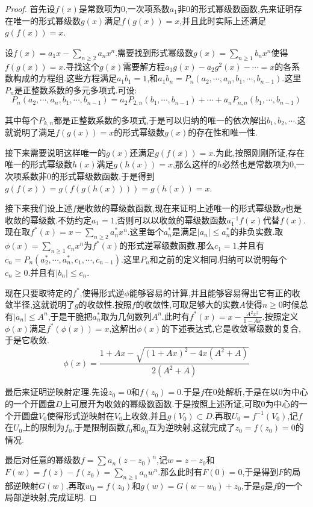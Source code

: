 \begin{proof}

首先设$f(x)$是常数项为0,一次项系数$a_1$非0的形式幂级数函数,先来证明存在唯一的形式幂级数$g(x)$满足$f(g(x))=x$,并且此时实际上还满足$g(f(x))=x$.

设$f(x)=a_1x-\sum_{n\ge2}a_nx^n$.需要找到形式幂级数$g(x)=\sum_{n\ge1}b_nx^n$使得$f(g(x))=x$.寻找这个$g(x)$需要解方程$a_1g(x)-a_2g^2(x)-\cdots=x$的各系数构成的方程组.这些方程满足$a_1b_1=1$,和$a_1b_n=P_n(a_2,\cdots,a_n,b_1,\cdots,b_{n-1})$.这里$P_n$是正整数系数的多元多项式.可设:
$$P_n(a_2,\cdots,a_n,b_1,\cdots,b_{n-1})=a_2P_{2,n}(b_1,\cdots,b_{n-1})+\cdots+a_nP_{n,n}(b_1,\cdots,b_{n-1})$$

其中每个$P_{k,n}$都是正整数系数的多项式,于是可以归纳的唯一的依次解出$b_1,b_2,\cdots$.这就说明了满足$f(g(x))=x$的形式幂级数$g(x)$的存在性和唯一性.

接下来需要说明这样唯一的$g(x)$还满足$g(f(x))=x$.为此,按照刚刚所证,存在唯一的形式幂级数$h(x)$满足$g(h(x))=x$,那么这样的$h$必然也是常数项为0,一次项系数非0的形式幂级数函数.于是得到$g(f(x))=g(f(g(h(x))))=g(h(x))=x$.

接下来我们设上述$f$是收敛的幂级数函数,现在来证明上述唯一的形式幂级数$g$也是收敛的幂级数.不妨约定$a_1=1$,否则可以以收敛的幂级数函数$a_1^{-1}f(x)$代替$f(x)$.现在取$f^*(x)=x-\sum_{n\ge2}a_n^*x^n$.这里每个$a_n^*$是满足$|a_n|\le a_n^*$的非负实数.取$\phi(x)=\sum_{n\ge1}c_nx^n$为$f^*(x)$的形式逆幂级数函数.那么$c_1=1$,并且有$c_n=P_n(a_2^*,\cdots,a_n^*,c_1,\cdots,c_{n-1})$.这里$P_n$和之前的定义相同.归纳可以说明每个$c_n\ge0$.并且有$|b_n|\le c_n$.

现在只要取特定的$f^*$,使得形式逆$\phi$能够容易的计算,并且能够容易得出它有正的收敛半径,这就说明了$g$的收敛性.按照$f$的收敛性,可取足够大的实数$A$使得$n\ge0$时候总有$|a_n|\le A^n$,于是干脆把$a_n^*$取为几何数列$A^n$.此时有$f^*(x)=x-\frac{A^2x^2}{1-Ax}$.按照定义$\phi(x)$满足$f^*(\phi(x))=x$,这解出$\phi(x)$的下述表达式,它是收敛幂级数的复合,于是它收敛.
$$\phi(x)=\frac{1+Ax-\sqrt{(1+Ax)^2-4x(A^2+A)}}{2(A^2+A)}$$

最后来证明逆映射定理.先设$z_0=0$和$f(z_0)=0$.于是$f$在0处解析,于是在以0为中心的一个开圆盘$D$上可展开为收敛的幂级数函数.于是按照上述所证,可取$0$为中心的一个开圆盘$V_0$使得形式逆映射在$V_0$上收敛,并且$g(V_0)\subset D$.再取$U_0=f^{-1}(V_0)$,记$f$在$U_0$上的限制为$f_0$,于是限制函数$f_0$和$g_0$互为逆映射,这就完成了$z_0=f(z_0)=0$的情况.

最后对任意的幂级数$f=\sum a_n(z-z_0)^n$,记$w=z-z_0$和$F(w)=f(z)-f(z_0)=\sum_{n\ge1}a_nw^n$.那么此时有$F(0)=0$,于是得到$F$的局部逆映射$G(w)$,再取$w_0=f(z_0)$和$g(w)=G(w-w_0)+z_0$,于是$g$是$f$的一个局部逆映射,完成证明.
\end{proof}

